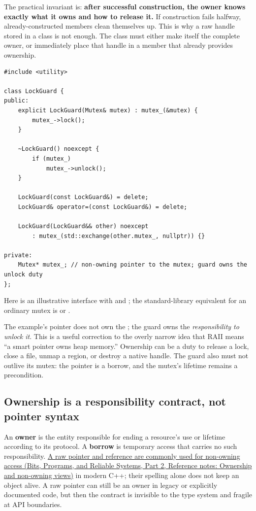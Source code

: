 The practical invariant is: \textbf{after successful construction, the owner knows exactly what it owns and how to release it.} If construction fails halfway, already-constructed members clean themselves up. This is why a raw handle stored in a class is not enough. The class must either make itself the complete owner, or immediately place that handle in a member that already provides ownership.

\begin{verbatim}
#include <utility>

class LockGuard {
public:
    explicit LockGuard(Mutex& mutex) : mutex_(&mutex) {
        mutex_->lock();
    }

    ~LockGuard() noexcept {
        if (mutex_)
            mutex_->unlock();
    }

    LockGuard(const LockGuard&) = delete;
    LockGuard& operator=(const LockGuard&) = delete;

    LockGuard(LockGuard&& other) noexcept
        : mutex_(std::exchange(other.mutex_, nullptr)) {}

private:
    Mutex* mutex_; // non-owning pointer to the mutex; guard owns the unlock duty
};
\end{verbatim}

Here  is an illustrative interface with  and ; the standard-library equivalent for an ordinary mutex is  or .

The example's pointer does not own the ; the guard owns the \emph{responsibility to unlock it}. This is a useful correction to the overly narrow idea that RAII means ``a smart pointer owns heap memory.'' Ownership can be a duty to release a lock, close a file, unmap a region, or destroy a native handle. The guard also must not outlive its mutex: the pointer is a borrow, and the mutex's lifetime remains a precondition.

\subsection{Ownership is a responsibility contract, not pointer syntax}\label{01-foundations-i-ch004-ownership-is-a-responsibility-contract-not-pointer-syntax}

\hypertarget{01-foundations-i-ch004-ownership-is-a-responsibility-contract-not-pointer-syntax}{}

An \textbf{owner} is the entity responsible for ending a resource's use or lifetime according to its protocol. A \textbf{borrow} is temporary access that carries no such responsibility. \href{../01-Bits-Programs-and-Reliable-Systems-P02/main.pdf\#nameddest=appendix-d52e4486f527}{A raw pointer and reference are commonly used for non-owning access (Bits, Programs, and Reliable Systems, Part 2, Reference notes: Ownership and non-owning views)} in modern C++; their spelling alone does not keep an object alive. A raw pointer can still be an owner in legacy or explicitly documented code, but then the contract is invisible to the type system and fragile at API boundaries.

